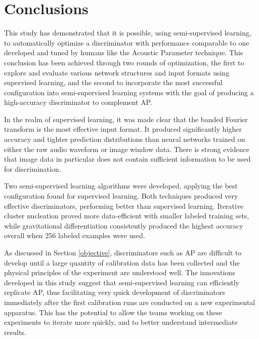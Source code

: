 \documentclass[10pt]{article}
\begin{document}

\section{Conclusions}

This study has demonstrated that it is possible, using semi-supervised learning, to automatically optimize a discriminator with performance comparable to one developed and tuned by humans like the Acoustic Parameter technique. This conclusion has been achieved through two rounds of optimization, the first to explore and evaluate various network structures and input formats using supervised learning, and the second to incorporate the most successful configuration into semi-supervised learning systems with the goal of producing a high-accuracy discriminator to complement AP.

In the realm of supervised learning, it was made clear that the banded Fourier transform is the most effective input format. It produced significantly higher accuracy and tighter prediction distributions than neural networks trained on either the raw audio waveform or image window data. There is strong evidence that image data in particular does not contain sufficient information to be used for discrimination.

Two semi-supervised learning algorithms were developed, applying the best configuration found for supervised learning. Both techniques produced very effective discriminators, performing better than supervised learning. Iterative cluster nucleation proved more data-efficient with smaller labeled training sets, while gravitational differentiation consistently produced the highest accuracy overall when 256 labeled examples were used.

As discussed in Section \ref{objective}, discriminators such as AP are difficult to develop until a large quantity of calibration data has been collected and the physical principles of the experiment are understood well. The innovations developed in this study suggest that semi-supervised learning can efficiently replicate AP, thus facilitating very quick development of discriminators immediately after the first calibration runs are conducted on a new experimental apparatus. This has the potential to allow the teams working on these experiments to iterate more quickly, and to better understand intermediate results.
\end{document}
